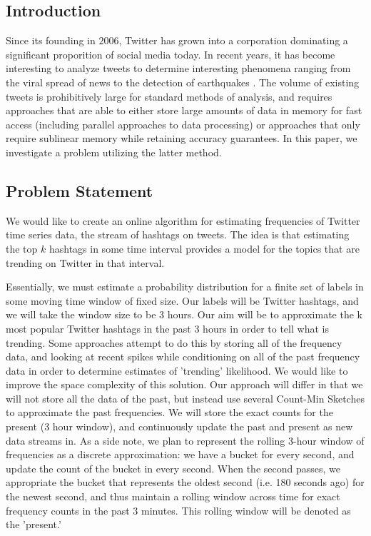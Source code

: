 \documentclass[twoside]{article}
\newcommand{\cc}[1]
 {\textbf{\cite{#1}}}
\begin{document}
\begin{multicols}{2} %

\section{Introduction} \label{sec:Intro}

Since its founding in $2006$, Twitter has grown into a corporation dominating a significant
proporition of social media today. In recent years, it has become interesting to analyze tweets
to determine interesting phenomena ranging from the viral spread of news to the detection of earthquakes \cc{Burks:2014}. The volume of existing tweets is prohibitively large for standard methods of analysis, and requires approaches that are able to either store large amounts of data in memory for fast access (including parallel approaches to data processing) or approaches that only require sublinear memory while retaining accuracy guarantees. In this paper, we investigate a problem utilizing the latter method. 

\subsection{Problem Statement} 


We would like to create an online algorithm for estimating frequencies of Twitter time series data, the stream of hashtags on tweets. The idea is that estimating the top $k$ hashtags in some time interval provides a model for the topics that are trending on Twitter in that interval.

 Essentially, we must estimate a probability distribution for a finite set of labels in some moving time window of fixed size. Our labels will be Twitter hashtags, and we will take the window size to be 3 hours. Our aim will be to approximate the k most popular Twitter hashtags in the past 3 hours in order to tell what is trending. Some approaches attempt to do this by storing all of the frequency data, and looking at recent spikes while conditioning on all of the past frequency data in order to determine estimates of 'trending' likelihood. We would like to improve the space complexity of this solution. Our approach will differ in that we will not store all the data of the past, but instead use several Count-Min Sketches to approximate the past frequencies. We will store the exact counts for the present (3 hour window), and continuously update the past and present as new data streams in. As a side note, we plan to represent the rolling 3-hour window of frequencies as a discrete approximation: we have a bucket for every second, and update the count of the bucket in every second. When the second passes, we appropriate the bucket that represents the oldest second (i.e. 180 seconds ago) for the newest second, and thus maintain a rolling window across time for exact frequency counts in the past 3 minutes. This rolling window will be denoted as the 'present.'


\end{multicols}
\end{document}
